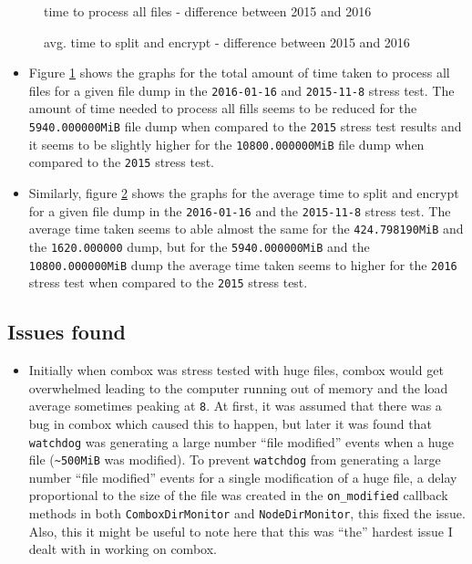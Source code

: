 \begin{figure}[h]
\centering

\caption{time to process all files - difference between 2015 and 2016}
\label{fig:5-st-tt-diff}
\end{figure}

\begin{figure}[h]
\centering

\caption{avg. time to split and encrypt - difference between 2015 and 2016}
\label{fig:5-st-atsae-diff}
\end{figure}

\begin{itemize}
\item Figure \ref{fig:5-st-tt-diff} shows the graphs for the total
  amount of time taken to process all files for a given file dump in
  the \verb+2016-01-16+ and \verb+2015-11-8+ stress test. The amount
  of time needed to process all fills seems to be reduced for the
  \verb+5940.000000MiB+ file dump when compared to the \verb+2015+
  stress test results and it seems to be slightly higher for the
  \verb+10800.000000MiB+ file dump when compared to the \verb+2015+
  stress test.
\item Similarly, figure \ref{fig:5-st-atsae-diff} shows the graphs for
  the average time to split and encrypt for a given file dump in the
  \verb+2016-01-16+ and the \verb+2015-11-8+ stress test. The average
  time taken seems to able almost the same for the
  \verb+424.798190MiB+ and the \verb+1620.000000+ dump, but for the
  \verb+5940.000000MiB+ and the \verb+10800.000000MiB+ dump the
  average time taken seems to higher for the \verb+2016+ stress test
  when compared to the \verb+2015+ stress test.
\end{itemize}

\subsection{Issues found}\label{5-st-if}

\begin{itemize}
\item Initially when combox was stress tested with huge files, combox
  would get overwhelmed leading to the computer running out of memory
  and the load average sometimes peaking at \verb+8+. At first, it was
  assumed that there was a bug in combox which caused this to happen,
  but later it was found that \verb+watchdog+\cite{pylib:watchdog} was
  generating a large number ``file modified'' events when a huge file
  (\verb+~500MiB+ was modified). To prevent \verb+watchdog+ from
  generating a large number ``file modified'' events for a single
  modification of a huge file, a delay proportional to the size of the
  file was created in the \verb+on_modified+ callback methods in both
  \verb+ComboxDirMonitor+ and
  \verb+NodeDirMonitor+\cite{git:bug-ten-fix}, this fixed the
  issue. Also, this it might be useful to note here that this was
  ``the'' hardest issue I dealt with in working on combox.
\end{itemize}